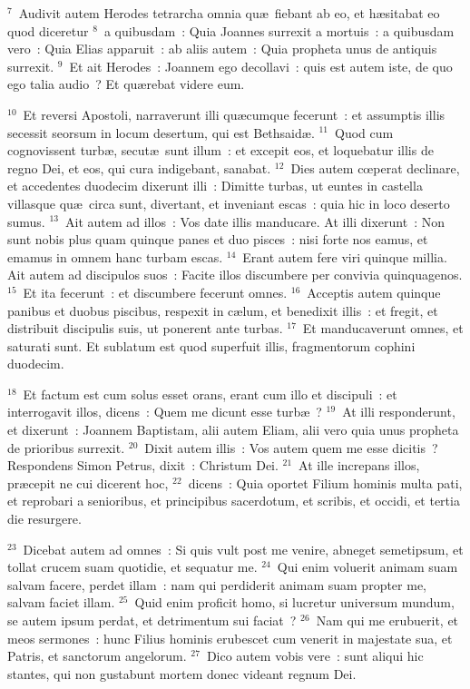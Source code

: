 ${}^{7}$~Audivit autem Herodes tetrarcha omnia qu\ae\ fiebant ab eo, et h\ae sitabat eo quod diceretur
${}^{8}$~a quibusdam~: Quia Joannes surrexit a mortuis~: a quibusdam vero~: Quia Elias apparuit~: ab aliis autem~: Quia propheta unus de antiquis surrexit.
${}^{9}$~Et ait Herodes~: Joannem ego decollavi~: quis est autem iste, de quo ego talia audio~? Et qu\ae rebat videre eum.


${}^{10}$~Et reversi Apostoli, narraverunt illi qu\ae cumque fecerunt~: et assumptis illis secessit seorsum in locum desertum, qui est Bethsaid\ae .
${}^{11}$~Quod cum cognovissent turb\ae , secut\ae\ sunt illum~: et excepit eos, et loquebatur illis de regno Dei, et eos, qui cura indigebant, sanabat.
${}^{12}$~Dies autem cœperat declinare, et accedentes duodecim dixerunt illi~: Dimitte turbas, ut euntes in castella villasque qu\ae\ circa sunt, divertant, et inveniant escas~: quia hic in loco deserto sumus.
${}^{13}$~Ait autem ad illos~: Vos date illis manducare. At illi dixerunt~: Non sunt nobis plus quam quinque panes et duo pisces~: nisi forte nos eamus, et emamus in omnem hanc turbam escas.
${}^{14}$~Erant autem fere viri quinque millia. Ait autem ad discipulos suos~: Facite illos discumbere per convivia quinquagenos.
${}^{15}$~Et ita fecerunt~: et discumbere fecerunt omnes.
${}^{16}$~Acceptis autem quinque panibus et duobus piscibus, respexit in c\ae lum, et benedixit illis~: et fregit, et distribuit discipulis suis, ut ponerent ante turbas.
${}^{17}$~Et manducaverunt omnes, et saturati sunt. Et sublatum est quod superfuit illis, fragmentorum cophini duodecim.


${}^{18}$~Et factum est cum solus esset orans, erant cum illo et discipuli~: et interrogavit illos, dicens~: Quem me dicunt esse turb\ae~?
${}^{19}$~At illi responderunt, et dixerunt~: Joannem Baptistam, alii autem Eliam, alii vero quia unus propheta de prioribus surrexit.
${}^{20}$~Dixit autem illis~: Vos autem quem me esse dicitis~? Respondens Simon Petrus, dixit~: Christum Dei.
${}^{21}$~At ille increpans illos, pr\ae cepit ne cui dicerent hoc,
${}^{22}$~dicens~: Quia oportet Filium hominis multa pati, et reprobari a senioribus, et principibus sacerdotum, et scribis, et occidi, et tertia die resurgere.


${}^{23}$~Dicebat autem ad omnes~: Si quis vult post me venire, abneget semetipsum, et tollat crucem suam quotidie, et sequatur me.
${}^{24}$~Qui enim voluerit animam suam salvam facere, perdet illam~: nam qui perdiderit animam suam propter me, salvam faciet illam.
${}^{25}$~Quid enim proficit homo, si lucretur universum mundum, se autem ipsum perdat, et detrimentum sui faciat~?
${}^{26}$~Nam qui me erubuerit, et meos sermones~: hunc Filius hominis erubescet cum venerit in majestate sua, et Patris, et sanctorum angelorum.
${}^{27}$~Dico autem vobis vere~: sunt aliqui hic stantes, qui non gustabunt mortem donec videant regnum Dei.


